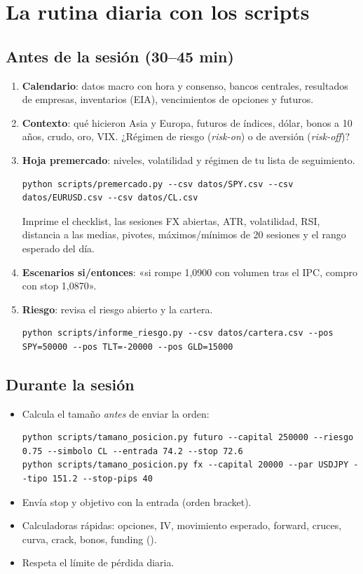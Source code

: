 \chapter{La rutina diaria con los scripts}\label{cap:rutina}

\section{Antes de la sesión (30--45 min)}
\begin{enumerate}
\item \textbf{Calendario}: datos macro con hora y consenso, bancos centrales, resultados de empresas,
  inventarios (EIA), vencimientos de opciones y futuros.
\item \textbf{Contexto}: qué hicieron Asia y Europa, futuros de índices, dólar, bonos a 10 años, crudo,
  oro, VIX. ¿Régimen de riesgo (\emph{risk-on}) o de aversión (\emph{risk-off})?
\item \textbf{Hoja premercado}: niveles, volatilidad y régimen de tu lista de seguimiento.
\begin{lstlisting}
python scripts/premercado.py --csv datos/SPY.csv --csv datos/EURUSD.csv --csv datos/CL.csv
\end{lstlisting}
  Imprime el checklist, las sesiones FX abiertas, ATR, volatilidad, RSI, distancia a las medias,
  pivotes, máximos/mínimos de 20 sesiones y el rango esperado del día.
\item \textbf{Escenarios si/entonces}: «si rompe 1,0900 con volumen tras el IPC, compro con stop 1,0870».
\item \textbf{Riesgo}: revisa el riesgo abierto y la cartera.
\begin{lstlisting}
python scripts/informe_riesgo.py --csv datos/cartera.csv --pos SPY=50000 --pos TLT=-20000 --pos GLD=15000
\end{lstlisting}
\end{enumerate}

\section{Durante la sesión}
\begin{itemize}
\item Calcula el tamaño \emph{antes} de enviar la orden:
\begin{lstlisting}
python scripts/tamano_posicion.py futuro --capital 250000 --riesgo 0.75 --simbolo CL --entrada 74.2 --stop 72.6
python scripts/tamano_posicion.py fx --capital 20000 --par USDJPY --tipo 151.2 --stop-pips 40
\end{lstlisting}
\item Envía stop y objetivo con la entrada (orden bracket).
\item Calculadoras rápidas: opciones, IV, movimiento esperado, forward, cruces, curva, crack, bonos, funding
  ().
\item Respeta el límite de pérdida diaria.
\end{itemize}

